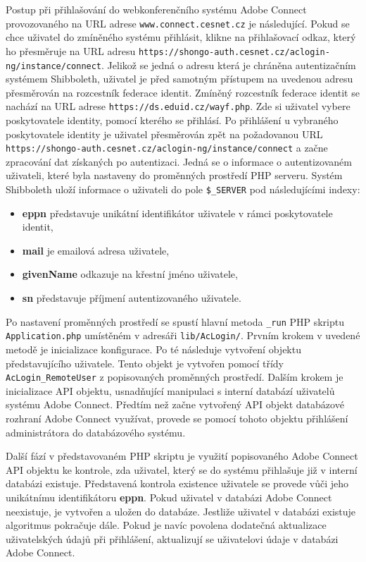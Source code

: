 \documentclass[
  printed, %
  twoside, %
  table,   %
  nolof,     %
  nolot,     %
]{fithesis3}
\begin{document}
Postup při přihlašování do webkonferenčního systému Adobe Connect provozovaného na URL adrese \texttt{www.connect.cesnet.cz} je následující. Pokud se chce uživatel do zmíněného systému přihlásit, klikne na přihlašovací odkaz, který ho přesměruje na URL adresu \texttt{https://shongo-auth.cesnet.cz/aclogin-ng/instance/connect}. Jelikož se jedná o adresu která je chráněna autentizačním systémem Shibboleth, uživatel je před samotným přístupem na uvedenou adresu přesměrován na rozcestník federace identit. Zmíněný rozcestník federace identit se nachází na URL adrese \texttt{https://ds.eduid.cz/wayf.php}. Zde si uživatel vybere poskytovatele identity, pomocí kterého se přihlásí. Po přihlášení u vybraného poskytovatele identity je uživatel  přesměrován zpět na požadovanou URL \texttt{https://shongo-auth.cesnet.cz/aclogin-ng/instance/connect} a začne zpracování dat získaných po autentizaci. Jedná se o informace o autentizovaném uživateli, které byla nastaveny do proměnných prostředí PHP serveru. Systém Shibboleth uloží informace o uživateli do pole \texttt{\$\_SERVER} pod následujícími indexy: 

\begin{itemize}
    \item \textbf{eppn} představuje unikátní identifikátor uživatele v rámci poskytovatele identit, 
    \item \textbf{mail} je emailová adresa uživatele, 
    \item \textbf{givenName} odkazuje na křestní jméno uživatele,
    \item \textbf{sn} představuje příjmení autentizovaného uživatele.
\end{itemize}
\label{item:adobe-connect}
Po nastavení proměnných prostředí se spustí hlavní metoda \texttt{\_run} PHP skriptu \texttt{Application.php} umístěném v adresáři \texttt{lib/AcLogin/}. Prvním krokem v uvedené metodě je inicializace konfigurace. Po té následuje vytvoření objektu představujícího uživatele. Tento objekt je vytvořen pomocí třídy \texttt{AcLogin\_RemoteUser} z popisovaných proměnných prostředí. Dalším krokem je inicializace API objektu, usnadňující manipulaci s interní databází uživatelů systému Adobe Connect. Předtím než začne vytvořený API objekt databázové rozhraní Adobe Connect využívat, provede se pomocí tohoto objektu přihlášení administrátora do databázového systému. \par 

Další fází v představovaném PHP skriptu je využití popisovaného Adobe Connect API objektu ke kontrole, zda uživatel, který se do systému přihlašuje již v interní databázi existuje. Představená kontrola existence uživatele se provede vůči jeho unikátnímu identifikátoru \textbf{eppn}. Pokud uživatel v databázi Adobe Connect neexistuje, je vytvořen a uložen do databáze. Jestliže uživatel v databázi existuje algoritmus pokračuje dále. Pokud je navíc povolena dodatečná aktualizace uživatelských údajů při přihlášení, aktualizují se uživatelovi údaje v databázi Adobe Connect. \par
\end{document}

